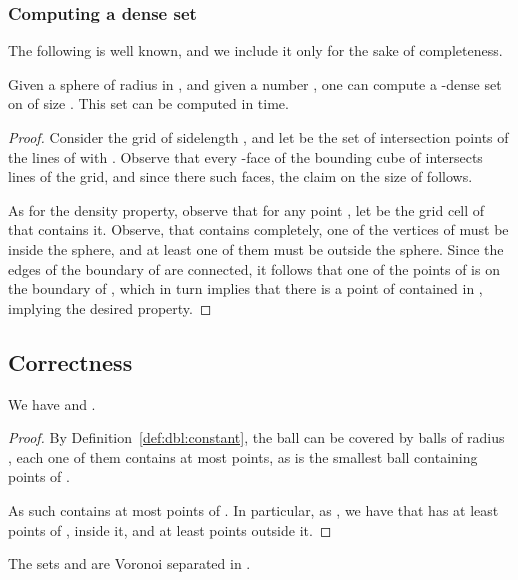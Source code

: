 \InSubmitVer{\documentclass[11pt]{article}}
\numberwithin{figure}{section}
\numberwithin{table}{section}
\numberwithin{equation}{section}
\newcommand{\lemlab}[1]{\label{lemma:#1}}
\newcommand{\defref}[1]{Definition~\ref{def:#1}}
\begin{document}
\subsubsection{Computing a dense set}

The following is well known, and we include it only for the sake of
completeness.
\begin{lemma}
    \lemlab{dense:set}Given a sphere  of radius  in , and given
    a number , one can compute a -dense set  on
     of size . This set can
    be computed in  time.
\end{lemma}
\begin{proof}
    Consider the grid  of sidelength , and let
     be the set of intersection points of the lines of 
    with . Observe that every -face of the bounding
    cube of  intersects 
    lines of the grid, and since there  such faces, the claim on
    the size of  follows.
    
    As for the density property, observe that for any point , let  be the grid cell of  that contains
    it. Observe, that  contains 
    completely, one of the vertices of  must be inside the
    sphere, and at least one of them must be outside the sphere. Since
    the edges of the boundary of  are connected, it follows
    that one of the points of  is on the boundary of ,
    which in turn implies that there is a point of  contained
    in , implying the desired property.
\end{proof}


\subsection{Correctness}

\begin{lemma}
    We have  and .
\end{lemma}
\begin{proof}
    By \defref{dbl:constant}, the ball 
    can be covered by  balls of radius , each one of
    them contains at most  points, as 
    is the smallest ball containing  points of .
    
    As such  contains at most  points of
    . In particular, as , we have that
     has at least  points of , inside it, and
    at least  points outside it.
\end{proof}

\begin{lemma}
    The sets  and  are Voronoi separated in
    .
\end{lemma}
\end{document}
